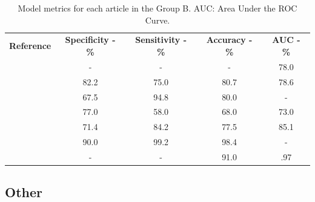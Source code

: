 \documentclass{article}
\begin{document}
\begin{table}[]
    \centering
    \begin{tabular}{ccccc}\toprule
        \multirow{2}{*}{\textbf{Reference}} & \multirow{2}{*}{\textbf{Specificity - \%}} & \multirow{2}{*}{\textbf{Sensitivity - \%}} & \multirow{2}{*}{\textbf{Accuracy - \%}} & \multirow{2}{*}{\textbf{AUC - \%}} \\
        \\\midrule
        \cite{Shoemaker2018}                & -                                          & -                                          & -                                       & 78.0                               \\
        \cite{Koyuncu2019}                  & 82.2                                       & 75.0                                       & 80.7                                    & 78.6                               \\
        \cite{Li2019}                       & 67.5                                       & 94.8                                       & 80.0                                    & -                                  \\
        \cite{Andersen2021}                 & 77.0                                       & 58.0                                       & 68.0                                    & 73.0                               \\
        \cite{Moawad2021}                   & 71.4                                       & 84.2                                       & 77.5                                    & 85.1                               \\
        \cite{Barstugan2020}                & 90.0                                       & 99.2                                       & 98.4                                    & -                                  \\
        \cite{Stanzione2021}                & -                                          & -                                          & 91.0                                    & .97                                \\
        \bottomrule
    \end{tabular}
    \caption{Model metrics for each article in the Group B. AUC: Area Under the ROC Curve.}
    \label{tab:res_B}
\end{table}

\subsection{Other}
\end{document}
